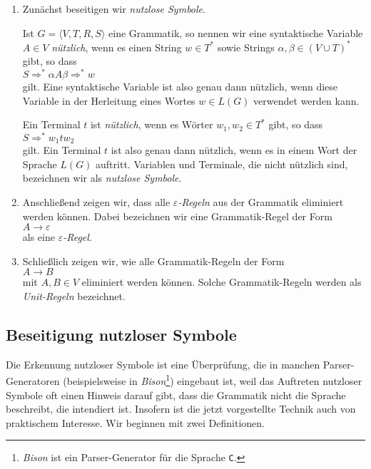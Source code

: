 \begin{enumerate}
\item Zun\"achst beseitigen wir \emph{nutzlose Symbole}.

      Ist $G = \langle V, T, R, S \rangle$ eine Grammatik, so nennen wir eine syntaktische Variable $A \in V$
      \emph{n\"utzlich}, wenn es einen String $w \in T^*$ sowie Strings $\alpha,\beta \in (V \cup T)^*$ gibt, 
      so dass 
      \\[0.2cm]
      \hspace*{1.3cm}
      $S \Rightarrow^* \alpha A \beta \Rightarrow^* w$
      \\[0.2cm]
      gilt.  Eine syntaktische Variable ist also genau dann n\"utzlich, wenn diese Variable in der Herleitung
      eines Wortes $w \in L(G)$ verwendet werden kann.

      Ein Terminal $t$ ist \emph{n\"utzlich}, wenn es W\"orter $w_1, w_2 \in T^*$ gibt, so dass
      \\[0.2cm]
      \hspace*{1.3cm}
      $S \Rightarrow^* w_1 t w_2$
      \\[0.2cm]
      gilt.  Ein Terminal $t$ ist also genau dann n\"utzlich, wenn es in einem Wort der Sprache $L(G)$
      auftritt.  Variablen und Terminale, die nicht n\"utzlich sind, bezeichnen wir als
      \emph{nutzlose Symbole}.
\item Anschlie{\ss}end zeigen wir, dass alle \emph{$\varepsilon$-Regeln} aus der Grammatik eliminiert werden k\"onnen.
      Dabei bezeichnen wir eine Grammatik-Regel der Form
      \\[0.2cm]
      \hspace*{1.3cm}
      $A \rightarrow \varepsilon$
      \\[0.2cm]
      als eine \emph{$\varepsilon$-Regel}.
\item Schlie{\ss}lich zeigen wir, wie alle Grammatik-Regeln der Form 
      \\[0.2cm]
      \hspace*{1.3cm}
      $A \rightarrow B$
      \\[0.2cm]
      mit $A,B \in V$ eliminiert werden k\"onnen.  Solche Grammatik-Regeln werden als
      \emph{Unit-Regeln} bezeichnet.
\end{enumerate}

\subsection{Beseitigung nutzloser Symbole}
Die Erkennung nutzloser Symbole ist eine \"Uberpr\"ufung, die in manchen Parser-Generatoren
(beispielsweise in \textsl{Bison}\footnote{
\textsl{Bison} ist ein Parser-Generator f\"ur die Sprache \texttt{C}.}) 
eingebaut ist, weil das Auftreten nutzloser Symbole oft
einen Hinweis darauf gibt, dass die Grammatik nicht die Sprache beschreibt, die intendiert ist.  
Insofern ist die jetzt vorgestellte Technik auch von praktischem Interesse.
Wir beginnen mit zwei Definitionen.

